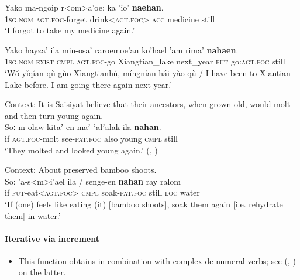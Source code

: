 \begin{exe}
	\ex\label{appendixSaisiyatIterative1}
	\gll Yako ma-ngoip r<om>a'oe: ka 'io' \textbf{naehan}.\\
	1\textsc{sg}.\textsc{nom}	\textsc{agt}.\textsc{foc}-forget drink<\textsc{agt}.\textsc{foc}> \textsc{acc} medicine still\\
	\glt \lq I forgot to take my medicine again.' \parencite[206]{Wang2018}
	
	\ex\label{appendixSaisiyatIterative2}
	 \gll Yako hayza' ila min-osa' raroemoe'an ko'hael 'am rima' \textbf{nahaen}.\\
	1\textsc{sg}.\textsc{nom} \textsc{exist} \textsc{cmpl} \textsc{agt}.\textsc{foc}-go Xiangtian\_lake next\_year \textsc{fut} go:\textsc{agt}.\textsc{foc} still\\
	\glt \lq Wŏ yĭqían qù-gùo Xìangtianhú, míngnían hái yào qù / I have been to Xiantian Lake before. I am going there again next year.' \parencite[101]{Huang2008}

 	\ex\label{exAppendixSaisiyatRestitutive1}
	Context: It is Saisiyat believe that their ancestors, when grown old, would molt and then turn young again.\\
	\gll Soː m-olaw kitaʼ-en maʼ ʼalʼalak ila \textbf{nahan}.\\
	if \textsc{agt}.\textsc{foc}-molt see-\textsc{pat}.\textsc{foc} also young \textsc{cmpl} still\\
	\glt \lq They molted and looked young again.' (\cite[587]{Huang2007}, \citeyear[106–107]{Huang2008})
	
		\ex\label{exAppendixSaisiyatRestitutive2}
	 Context: About preserved bamboo shoots.\\
	 \gll So: 'a-s<m>i’ael	ila /  senge-en \textbf{nahan} ray ralom\\
	 if \textsc{fut}-eat<\textsc{agt}.\textsc{foc}> \textsc{cmpl} {} soak-\textsc{pat}.\textsc{foc} still \textsc{loc} water\\
	 \glt \lq If (one) feels like eating (it) [bamboo shoots], soak them again [i.e. rehydrate them] in water.' \parencite[588]{Huang2007}
\end{exe}

\paragraph{Iterative via increment}
\label{appendixSaiyiatIterativeIncrement}
\begin{itemize}
	\sloppy
	\item This function obtains in combination with complex de-numeral verbs; see \citeauthor{ZeitounEtal2010} (\citeyear[575–577]{ZeitounEtal2010}, \citeyear[522]{ZeitounEtal2015}) on the latter.
\end{itemize}

